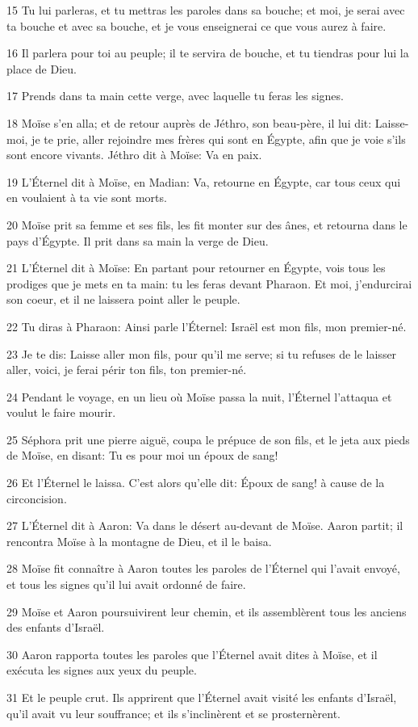 \par 15 Tu lui parleras, et tu mettras les paroles dans sa bouche; et moi, je serai avec ta bouche et avec sa bouche, et je vous enseignerai ce que vous aurez à faire.
\par 16 Il parlera pour toi au peuple; il te servira de bouche, et tu tiendras pour lui la place de Dieu.
\par 17 Prends dans ta main cette verge, avec laquelle tu feras les signes.
\par 18 Moïse s'en alla; et de retour auprès de Jéthro, son beau-père, il lui dit: Laisse-moi, je te prie, aller rejoindre mes frères qui sont en Égypte, afin que je voie s'ils sont encore vivants. Jéthro dit à Moïse: Va en paix.
\par 19 L'Éternel dit à Moïse, en Madian: Va, retourne en Égypte, car tous ceux qui en voulaient à ta vie sont morts.
\par 20 Moïse prit sa femme et ses fils, les fit monter sur des ânes, et retourna dans le pays d'Égypte. Il prit dans sa main la verge de Dieu.
\par 21 L'Éternel dit à Moïse: En partant pour retourner en Égypte, vois tous les prodiges que je mets en ta main: tu les feras devant Pharaon. Et moi, j'endurcirai son coeur, et il ne laissera point aller le peuple.
\par 22 Tu diras à Pharaon: Ainsi parle l'Éternel: Israël est mon fils, mon premier-né.
\par 23 Je te dis: Laisse aller mon fils, pour qu'il me serve; si tu refuses de le laisser aller, voici, je ferai périr ton fils, ton premier-né.
\par 24 Pendant le voyage, en un lieu où Moïse passa la nuit, l'Éternel l'attaqua et voulut le faire mourir.
\par 25 Séphora prit une pierre aiguë, coupa le prépuce de son fils, et le jeta aux pieds de Moïse, en disant: Tu es pour moi un époux de sang!
\par 26 Et l'Éternel le laissa. C'est alors qu'elle dit: Époux de sang! à cause de la circoncision.
\par 27 L'Éternel dit à Aaron: Va dans le désert au-devant de Moïse. Aaron partit; il rencontra Moïse à la montagne de Dieu, et il le baisa.
\par 28 Moïse fit connaître à Aaron toutes les paroles de l'Éternel qui l'avait envoyé, et tous les signes qu'il lui avait ordonné de faire.
\par 29 Moïse et Aaron poursuivirent leur chemin, et ils assemblèrent tous les anciens des enfants d'Israël.
\par 30 Aaron rapporta toutes les paroles que l'Éternel avait dites à Moïse, et il exécuta les signes aux yeux du peuple.
\par 31 Et le peuple crut. Ils apprirent que l'Éternel avait visité les enfants d'Israël, qu'il avait vu leur souffrance; et ils s'inclinèrent et se prosternèrent.

